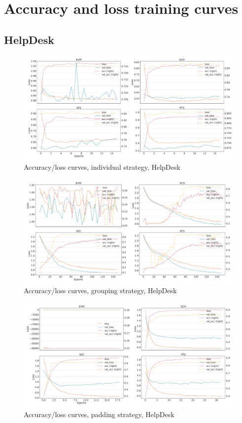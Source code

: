 \chapter{Accuracy and loss training curves}
\label{appendix:loss-curves}

\section*{HelpDesk}
\begin{figure}[!htb]
    \centering
    \includegraphics[width=\textwidth]{gfx/helpdesk/individual_loss_acc_curve.pdf}
    \caption{Accuracy/loss curves, individual strategy, HelpDesk}
\end{figure}
\begin{figure}[!htb]
    \centering
    \includegraphics[width=\textwidth]{gfx/helpdesk/grouped_loss_acc_curve.pdf}
    \caption{Accuracy/loss curves, grouping strategy, HelpDesk}
\end{figure}
\begin{figure}[!htb]
    \centering
    \includegraphics[width=\textwidth]{gfx/helpdesk/padded_loss_acc_curve.pdf}
    \caption{Accuracy/loss curves, padding strategy, HelpDesk}
\end{figure}
